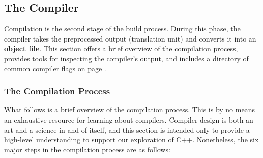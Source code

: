 \documentclass[12pt]{article}
\begin{document}
\subsection{The Compiler}

\noindent
Compilation is the second stage of the build process.
During this phase, the compiler takes the preprocessed output (translation unit) and converts it into an \textbf{object file}.
This section offers a brief overview of the compilation process, provides tools for inspecting the compiler's output, and includes a directory of common compiler flags on page \pageref{tab:compiler-flags-begin}.

\subsubsection{The Compilation Process}

\noindent
What follows is a brief overview of the compilation process.
This is by no means an exhaustive resource for learning about compilers.
Compiler design is both an art and a science in and of itself, and this section is intended only to provide a high-level understanding to support our exploration of C++.
Nonetheless, the six major steps in the compilation process are as follows:
\end{document}
